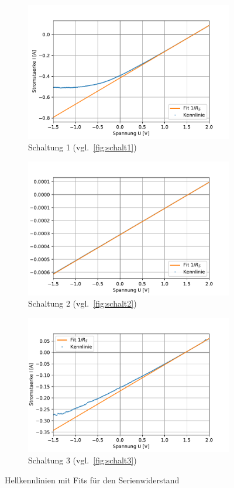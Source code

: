 \documentclass[slug=SZ, room=Hermann-Krone-Bau\,\ Labor\ 1.25, supervisor=Martin\ Kroll]{../../Lab_Report_LaTeX/lab_report}
\begin{document}
\begin{figure}[H]\centering
        \begin{subfigure}[b]{1\textwidth}\centering
                \includegraphics[width=.6\columnwidth]{figs/python/3x3_schaltung_2_rs.pdf}
                \caption{Schaltung 1 (vgl.~\ref{fig:schalt1})}
                \label{diag:hellschalt1fit1}
        \end{subfigure}
        \begin{subfigure}[b]{1\textwidth}\centering
                \includegraphics[width=.6\columnwidth]{figs/python/3x3_schaltung_3_rs.pdf}
                \caption{Schaltung 2 (vgl.~\ref{fig:schalt2})}
                \label{diag:hellschalt2fit1}
        \end{subfigure}
        \begin{subfigure}[b]{1\textwidth}\centering
                \includegraphics[width=.6\columnwidth]{figs/python/3x3_schaltung_4_rs.pdf}
                \caption{Schaltung 3 (vgl.~\ref{fig:schalt3})}
                \label{diag:hellschalt3fit1}
        \end{subfigure}
        \caption{Hellkennlinien mit Fits f\"ur den Serienwiderstand}
        \label{fig:hellkennfit1}
\end{figure}
\end{document}
